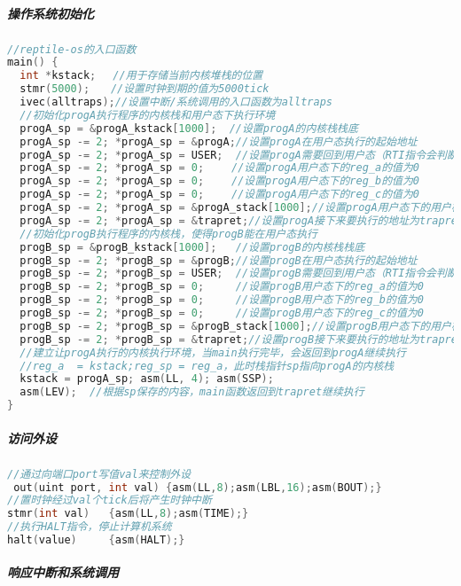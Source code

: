 \subparagraph{操作系统初始化}
\begin{lstlisting}[language={C}]
//reptile-os的入口函数
main() {
  int *kstack;　 //用于存储当前内核堆栈的位置　　　　　　　　　　　　　　 
  stmr(5000);　　//设置时钟到期的值为5000tick
  ivec(alltraps);//设置中断/系统调用的入口函数为alltraps
  //初始化progA执行程序的内核栈和用户态下执行环境
  progA_sp = &progA_kstack[1000];  //设置progA的内核栈栈底
  progA_sp -= 2; *progA_sp = &progA;//设置progA在用户态执行的起始地址
  progA_sp -= 2; *progA_sp = USER;  //设置progA需要回到用户态（RTI指令会判断）
  progA_sp -= 2; *progA_sp = 0; 　　//设置progA用户态下的reg_a的值为0
  progA_sp -= 2; *progA_sp = 0; 　　//设置progA用户态下的reg_b的值为0
  progA_sp -= 2; *progA_sp = 0; 　　//设置progA用户态下的reg_c的值为0
  progA_sp -= 2; *progA_sp = &progA_stack[1000];//设置progA用户态下的用户栈
  progA_sp -= 2; *progA_sp = &trapret;//设置progA接下来要执行的地址为trapret  
  //初始化progB执行程序的内核栈，使得progB能在用户态执行  
  progB_sp = &progB_kstack[1000];   //设置progB的内核栈栈底
  progB_sp -= 2; *progB_sp = &progB;//设置progB在用户态执行的起始地址
  progB_sp -= 2; *progB_sp = USER;  //设置progB需要回到用户态（RTI指令会判断）
  progB_sp -= 2; *progB_sp = 0;     //设置progB用户态下的reg_a的值为0
  progB_sp -= 2; *progB_sp = 0;     //设置progB用户态下的reg_b的值为0
  progB_sp -= 2; *progB_sp = 0;     //设置progB用户态下的reg_c的值为0
  progB_sp -= 2; *progB_sp = &progB_stack[1000];//设置progB用户态下的用户栈
  progB_sp -= 2; *progB_sp = &trapret;//设置progB接下来要执行的地址为trapret
  //建立让progA执行的内核执行环境，当main执行完毕，会返回到progA继续执行
  //reg_a  = kstack;reg_sp = reg_a，此时栈指针sp指向progA的内核栈
  kstack = progA_sp; asm(LL, 4); asm(SSP);         
  asm(LEV);  //根据sp保存的内容，main函数返回到trapret继续执行 
}
\end{lstlisting}

\subparagraph{访问外设}

\begin{lstlisting}[language={C}]
//通过向端口port写值val来控制外设
 out(uint port, int val) {asm(LL,8);asm(LBL,16);asm(BOUT);}
//置时钟经过val个tick后将产生时钟中断
stmr(int val)   {asm(LL,8);asm(TIME);}
//执行HALT指令，停止计算机系统
halt(value)     {asm(HALT);}
\end{lstlisting}

\subparagraph{响应中断和系统调用}

